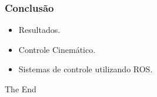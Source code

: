\documentclass{beamer}
\begin{document}
\begin{frame}
\frametitle{Conclusão}
\begin{itemize}
\item Resultados.
\item Controle Cinemático.
\item Sistemas de controle utilizando ROS.
\end{itemize}
\end{frame}


\begin{frame}
\Huge{\centerline{The End}}
\end{frame}

\end{document}
